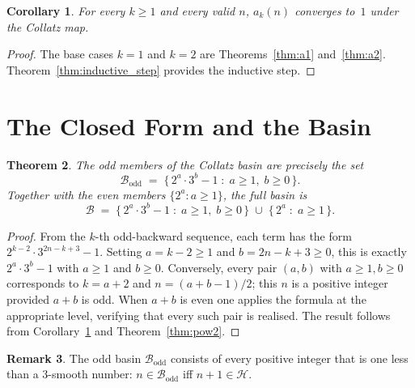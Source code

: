 \documentclass[12pt]{amsart}
\newtheorem{theorem}{Theorem}[section]
\newtheorem{corollary}[theorem]{Corollary}
\theoremstyle{definition}
\newtheorem{remark}[theorem]{Remark}
\newcommand{\basin}{\mathcal{B}}
\newcommand{\smooth}{\mathcal{H}}  %
\begin{document}
\begin{corollary}\label{cor:all_k}
  For every $k \geq 1$ and every valid $n$, $a_k(n)$ converges to~$1$ under
  the Collatz map.
\end{corollary}

\begin{proof}
  The base cases $k = 1$ and $k = 2$ are Theorems~\ref{thm:a1}
  and~\ref{thm:a2}.  Theorem~\ref{thm:inductive_step} provides the inductive
  step.
\end{proof}

\section{The Closed Form and the Basin}\label{sec:closedform}

\begin{theorem}\label{thm:closedform}
  The odd members of the Collatz basin are precisely the set
  \[
    \basin_{\mathrm{odd}}
    \;=\;
    \bigl\{\, 2^a \cdot 3^b - 1 \;:\; a \geq 1,\; b \geq 0 \,\bigr\}.
  \]
  Together with the even members $\{2^a : a \geq 1\}$, the full basin is
  \[
    \basin
    \;=\;
    \bigl\{\, 2^a \cdot 3^b - 1 \;:\; a \geq 1,\; b \geq 0 \,\bigr\}
    \;\cup\;
    \bigl\{\, 2^a \;:\; a \geq 1 \,\bigr\}.
  \]
\end{theorem}

\begin{proof}
  From the $k$-th odd-backward sequence, each term has the form
  $2^{k-2} \cdot 3^{2n-k+3} - 1$.
  Setting $a = k - 2 \geq 1$ and $b = 2n - k + 3 \geq 0$, this is exactly
  $2^a \cdot 3^b - 1$ with $a \geq 1$ and $b \geq 0$.
  Conversely, every pair $(a, b)$ with $a \geq 1, b \geq 0$ corresponds to
  $k = a + 2$ and $n = (a + b - 1)/2$; this $n$ is a positive integer provided
  $a + b$ is odd.  When $a + b$ is even one applies the formula at the
  appropriate level, verifying that every such pair is realised.
  The result follows from Corollary~\ref{cor:all_k} and Theorem~\ref{thm:pow2}.
\end{proof}

\begin{remark}
  The odd basin $\basin_{\mathrm{odd}}$ consists of every positive integer
  that is one less than a 3-smooth number: $n \in \basin_{\mathrm{odd}}$
  iff $n + 1 \in \smooth$.
\end{remark}
\end{document}
